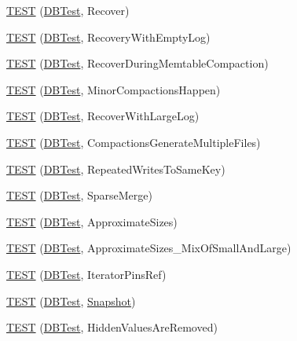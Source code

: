 \begin{DoxyCompactItemize}
\item 
\hyperlink{namespaceleveldb_ab1872cabf2fb215814f9a6f1bacacc80}{T\+E\+S\+T} (\hyperlink{classleveldb_1_1_d_b_test}{D\+B\+Test}, Recover)
\item 
\hyperlink{namespaceleveldb_a890ebffd31d77bc8acb760088d70ee8c}{T\+E\+S\+T} (\hyperlink{classleveldb_1_1_d_b_test}{D\+B\+Test}, Recovery\+With\+Empty\+Log)
\item 
\hyperlink{namespaceleveldb_a2e24806457c57e7dec22e3c05e46a82c}{T\+E\+S\+T} (\hyperlink{classleveldb_1_1_d_b_test}{D\+B\+Test}, Recover\+During\+Memtable\+Compaction)
\item 
\hyperlink{namespaceleveldb_a1ff90ae7b19ecf46c5efb6e5af00fa0a}{T\+E\+S\+T} (\hyperlink{classleveldb_1_1_d_b_test}{D\+B\+Test}, Minor\+Compactions\+Happen)
\item 
\hyperlink{namespaceleveldb_a01bbbae1753711e8b7740ed8faa9efd6}{T\+E\+S\+T} (\hyperlink{classleveldb_1_1_d_b_test}{D\+B\+Test}, Recover\+With\+Large\+Log)
\item 
\hyperlink{namespaceleveldb_acd61524dbc544e8f1ca63fbdfac59791}{T\+E\+S\+T} (\hyperlink{classleveldb_1_1_d_b_test}{D\+B\+Test}, Compactions\+Generate\+Multiple\+Files)
\item 
\hyperlink{namespaceleveldb_acb51ac2eb77bd1af22372748f9fb44da}{T\+E\+S\+T} (\hyperlink{classleveldb_1_1_d_b_test}{D\+B\+Test}, Repeated\+Writes\+To\+Same\+Key)
\item 
\hyperlink{namespaceleveldb_a0ed510b8c03c1ca0216ffee81199d79e}{T\+E\+S\+T} (\hyperlink{classleveldb_1_1_d_b_test}{D\+B\+Test}, Sparse\+Merge)
\item 
\hyperlink{namespaceleveldb_a6b3f1122dc9d727f0c699ed3da2d6474}{T\+E\+S\+T} (\hyperlink{classleveldb_1_1_d_b_test}{D\+B\+Test}, Approximate\+Sizes)
\item 
\hyperlink{namespaceleveldb_a5c41c70ccd20279235316b8627f419da}{T\+E\+S\+T} (\hyperlink{classleveldb_1_1_d_b_test}{D\+B\+Test}, Approximate\+Sizes\+\_\+\+Mix\+Of\+Small\+And\+Large)
\item 
\hyperlink{namespaceleveldb_a899f7415195fa4d25d801246cdec721d}{T\+E\+S\+T} (\hyperlink{classleveldb_1_1_d_b_test}{D\+B\+Test}, Iterator\+Pins\+Ref)
\item 
\hyperlink{namespaceleveldb_ab09998970d1ace06b8082f49da0444f5}{T\+E\+S\+T} (\hyperlink{classleveldb_1_1_d_b_test}{D\+B\+Test}, \hyperlink{classleveldb_1_1_snapshot}{Snapshot})
\item 
\hyperlink{namespaceleveldb_a94214aebbf6328e7ad9ba735c5e42f68}{T\+E\+S\+T} (\hyperlink{classleveldb_1_1_d_b_test}{D\+B\+Test}, Hidden\+Values\+Are\+Removed)

\end{DoxyCompactItemize}
